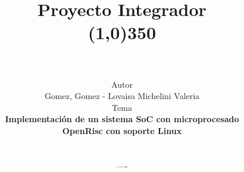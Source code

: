 \documentclass[a4paper,12pt]{report}
\begin{document}
\title{\vspace{-4cm} \textbf{Proyecto Integrador \\ \line(1,0){350}}\\
  \vspace{0.5cm}\\}
\author{\vspace{-0.25cm} Autor \vspace{0.25cm}\\ Gomez, Gomez - Lovaisa Michelini Valeria \bigskip \bigskip \bigskip \\
  Tema \vspace{0.25cm} \\ \textbf{Implementación de un sistema SoC con microprocesado  }\\ \textbf{OpenRisc con soporte Linux} \\ \textbf{} \bigskip \bigskip \bigskip \bigskip\\
  \begin{normalsize}---- \bigskip \bigskip \end{normalsize}\\ }
\date{}
\end{document}
